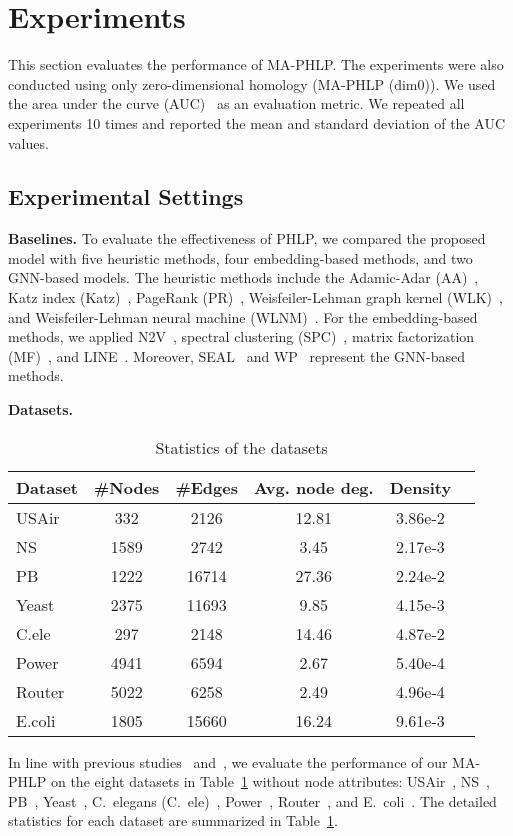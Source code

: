 \section{Experiments}
This section evaluates the performance of MA-PHLP. 
The experiments were also conducted using only zero-dimensional homology (MA-PHLP (dim$0$)).
We used the area under the curve (AUC)~\cite{bradley1997use} as an evaluation metric. We repeated all experiments 10 times and reported the mean and standard deviation of the AUC values. 

\subsection{Experimental Settings}

\noindent\textbf{Baselines.} To evaluate the effectiveness of PHLP, we compared the proposed model with five heuristic methods, four embedding-based methods, and two GNN-based models. The heuristic methods include the Adamic-Adar (AA)~\cite{adamic2003friends}, Katz index (Katz)~\cite{katz1953new}, PageRank (PR)~\cite{brin1998anatomy}, Weisfeiler-Lehman graph kernel (WLK)~\cite{shervashidze2011weisfeiler}, and Weisfeiler-Lehman neural machine (WLNM)~\cite{zhang2017weisfeiler}. 
For the embedding-based methods, we applied N2V~\cite{grover2016node2vec}, spectral clustering (SPC)~\cite{tang2011leveraging}, matrix factorization (MF)~\cite{koren2009matrix}, and LINE~\cite{tang2015line}. Moreover, SEAL~\cite{zhang2018link} and WP~\cite{pan2021neural} represent the GNN-based methods. 

\noindent\textbf{Datasets.}
\begin{table}[ht!]
\centering
\caption{Statistics of the datasets}
\begin{tabular}{l|ccccc}
\toprule
Dataset & \#Nodes & \#Edges & Avg. node deg. & Density \\
\midrule
{USAir} & 332 & 2126 & 12.81 & 3.86e-2 \\ 
{NS} & 1589 & 2742 & 3.45 & 2.17e-3 \\ 
{PB} & 1222 & 16714 & 27.36 & 2.24e-2 \\ 
{Yeast} & 2375 & 11693 & 9.85 & 4.15e-3 \\ 
{C.ele} & 297 & 2148 & 14.46 & 4.87e-2 \\ 
{Power} & 4941 & 6594 & 2.67 & 5.40e-4 \\ 
{Router} & 5022 & 6258 & 2.49 & 4.96e-4 \\ 
{E.coli} & 1805 & 15660 & 16.24 & 9.61e-3 \\ 
\bottomrule
\end{tabular}
\label{tbl:dataset}
\end{table}
In line with previous studies~\cite{zhang2018link} and~\cite{pan2021neural}, we evaluate the performance of our MA-PHLP on the eight datasets in Table~\ref{tbl:dataset} without node attributes: USAir~\cite{batagelj2006pajek}, NS~\cite{newman2006finding}, PB~\cite{ackland2005mapping}, Yeast~\cite{von2002comparative}, C.~elegans (C.~ele)~\cite{watts1998collective}, Power~\cite{watts1998collective}, Router~\cite{spring2002measuring}, and E.~coli~\cite{zhang2018beyond}. 
The detailed statistics for each dataset are summarized in Table~\ref{tbl:dataset}.

